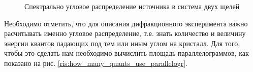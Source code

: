 \begin{figure}[H]
  \centering
  \hfill
  \caption{Спектрально угловое распределение источника в система двух щелей}
  \label{ris:sourc_map}
\end{figure}

Необходимо отметить, что для описания дифракционного эксперимента важно расчитывать именно
угловое распределение, т.е. знать количество и величину энергии квантов падающих под тем
или иным углом на кристалл. Для того, чтобы это сделать нам необходимо вычислить площадь параллелограммов,
как показано на рис. \ref{ris:how_many_quants_use_parallelogr}.


